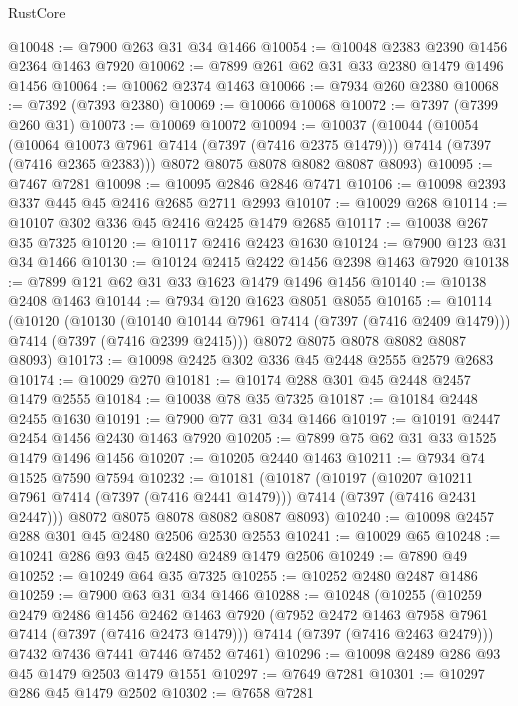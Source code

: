 \begin{lexlean}{RustCore}
\begin{coremodule}
@10048 := @7900 @263 @31 @34 @1466
@10054 := @10048 @2383 @2390 @1456 @2364 @1463 @7920
@10062 := @7899 @261 @62 @31 @33 @2380 @1479 @1496 @1456
@10064 := @10062 @2374 @1463
@10066 := @7934 @260 @2380
@10068 := @7392 (@7393 @2380)
@10069 := @10066 @10068
@10072 := @7397 (@7399 @260 @31)
@10073 := @10069 @10072
@10094 := @10037
    (@10044
      (@10054
        (@10064 @10073 @7961 @7414 (@7397 (@7416 @2375 @1479)))
        @7414
        (@7397 (@7416 @2365 @2383)))
      @8072
      @8075
      @8078
      @8082
      @8087
      @8093)
@10095 := @7467 @7281
@10098 := @10095 @2846 @2846 @7471
@10106 := @10098 @2393 @337 @445 @45 @2416 @2685 @2711 @2993
@10107 := @10029 @268
@10114 := @10107 @302 @336 @45 @2416 @2425 @1479 @2685
@10117 := @10038 @267 @35 @7325
@10120 := @10117 @2416 @2423 @1630
@10124 := @7900 @123 @31 @34 @1466
@10130 := @10124 @2415 @2422 @1456 @2398 @1463 @7920
@10138 := @7899 @121 @62 @31 @33 @1623 @1479 @1496 @1456
@10140 := @10138 @2408 @1463
@10144 := @7934 @120 @1623 @8051 @8055
@10165 := @10114
    (@10120
      (@10130
        (@10140 @10144 @7961 @7414 (@7397 (@7416 @2409 @1479)))
        @7414
        (@7397 (@7416 @2399 @2415)))
      @8072
      @8075
      @8078
      @8082
      @8087
      @8093)
@10173 := @10098 @2425 @302 @336 @45 @2448 @2555 @2579 @2683
@10174 := @10029 @270
@10181 := @10174 @288 @301 @45 @2448 @2457 @1479 @2555
@10184 := @10038 @78 @35 @7325
@10187 := @10184 @2448 @2455 @1630
@10191 := @7900 @77 @31 @34 @1466
@10197 := @10191 @2447 @2454 @1456 @2430 @1463 @7920
@10205 := @7899 @75 @62 @31 @33 @1525 @1479 @1496 @1456
@10207 := @10205 @2440 @1463
@10211 := @7934 @74 @1525 @7590 @7594
@10232 := @10181
    (@10187
      (@10197
        (@10207 @10211 @7961 @7414 (@7397 (@7416 @2441 @1479)))
        @7414
        (@7397 (@7416 @2431 @2447)))
      @8072
      @8075
      @8078
      @8082
      @8087
      @8093)
@10240 := @10098 @2457 @288 @301 @45 @2480 @2506 @2530 @2553
@10241 := @10029 @65
@10248 := @10241 @286 @93 @45 @2480 @2489 @1479 @2506
@10249 := @7890 @49
@10252 := @10249 @64 @35 @7325
@10255 := @10252 @2480 @2487 @1486
@10259 := @7900 @63 @31 @34 @1466
@10288 := @10248
    (@10255
      (@10259
        @2479
        @2486
        @1456
        @2462
        @1463
        @7920
        (@7952 @2472 @1463 @7958 @7961 @7414 (@7397 (@7416 @2473 @1479)))
        @7414
        (@7397 (@7416 @2463 @2479)))
      @7432
      @7436
      @7441
      @7446
      @7452
      @7461)
@10296 := @10098 @2489 @286 @93 @45 @1479 @2503 @1479 @1551
@10297 := @7649 @7281
@10301 := @10297 @286 @45 @1479 @2502
@10302 := @7658 @7281

\end{coremodule}
\end{lexlean}
